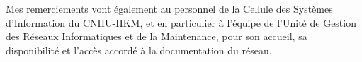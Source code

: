 \remerciements


Mes remerciements vont également au personnel de la Cellule des Systèmes d'Information du CNHU-HKM, et en particulier à l'équipe de l'Unité de Gestion des Réseaux Informatiques et de la Maintenance, pour son accueil, sa disponibilité et l'accès accordé à la documentation du réseau. 
